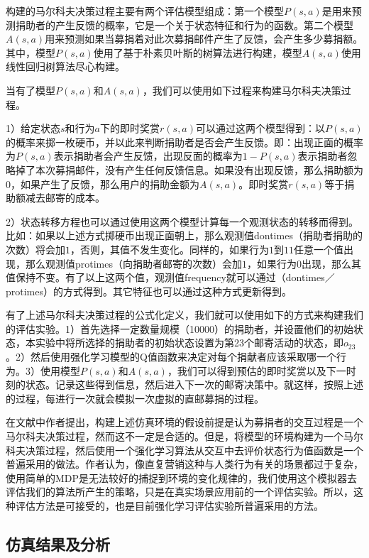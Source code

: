 构建的马尔科夫决策过程主要有两个评估模型组成：第一个模型$P(s,a)$是用来预测捐助者的产生反馈的概率，它是一个关于状态特征和行为的函数。第二个模型$A(s,a)$用来预测如果当募捐着对此次募捐邮件产生了反馈，会产生多少募捐额。其中，模型$P(s,a)$使用了基于朴素贝叶斯的树算法进行构建，模型$A(s,a)$使用线性回归树算法尽心构建。

当有了模型$P(s,a)$和$A(s,a)$，我们可以使用如下过程来构建马尔科夫决策过程。

1）给定状态$s$和行为$a$下的即时奖赏$r(s,a)$可以通过这两个模型得到：以$P(s,a)$的概率来掷一枚硬币，并以此来判断捐助者是否会产生反馈。即：出现正面的概率为$P(s,a)$表示捐助者会产生反馈，出现反面的概率为$1-P(s,a)$表示捐助者忽略掉了本次募捐邮件，没有产生任何反馈信息。如果没有出现反馈，那么捐助额为$0$，如果产生了反馈，那么用户的捐助金额为$A(s,a)$。即时奖赏$r(s,a)$等于捐助额减去邮寄的成本。

2）状态转移方程也可以通过使用这两个模型计算每一个观测状态的转移而得到。比如：如果以上述方式掷硬币出现正面朝上，那么观测值dontimes（捐助者捐助的次数）将会加$1$，否则，其值不发生变化。同样的，如果行为$1$到$11$任意一个值出现，那么观测值protimes（向捐助者邮寄的次数）会加$1$，如果行为$0$出现，那么其值保持不变。有了以上这两个值，观测值frequency就可以通过（dontimes／protimes）的方式得到。其它特征也可以通过这种方式更新得到。

有了上述马尔科夫决策过程的公式化定义，我们就可以使用如下的方式来构建我们的评估实验。1）首先选择一定数量规模（10000）的捐助者，并设置他们的初始状态，本实验中将所选择的捐助者的初始状态设置为第23个邮寄活动的状态，即$o_{23}$。2）然后使用强化学习模型的Q值函数来决定对每个捐献者应该采取哪一个行为。3）使用模型$P(s,a)$和$A(s,a)$，我们可以得到预估的即时奖赏以及下一时刻的状态。记录这些得到信息，然后进入下一次的邮寄决策中。就这样，按照上述的过程，每进行一次就会模拟一次虚拟的直邮募捐的过程。

在文献\citep{pednault2002sequential}中作者提出，构建上述仿真环境的假设前提是认为募捐者的交互过程是一个马尔科夫决策过程，然而这不一定是合适的。但是，将模型的环境构建为一个马尔科夫决策过程，然后使用一个强化学习算法从交互中去评价状态行为值函数是一个普遍采用的做法。作者认为，像直复营销这种与人类行为有关的场景都过于复杂，使用简单的MDP是无法较好的捕捉到环境的变化规律的，我们使用这个模拟器去评估我们的算法所产生的策略，只是在真实场景应用前的一个评估实验。所以，这种评估方法是可接受的，也是目前强化学习评估实验所普遍采用的方法。

\subsection{仿真结果及分析}

